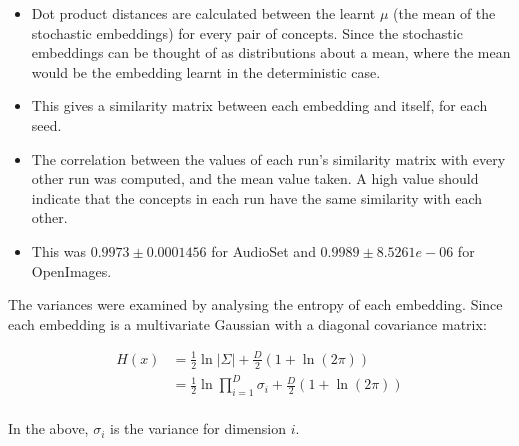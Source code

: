 \begin{itemize}
    \item Dot product distances are calculated between the learnt $\mu$ (the mean of the stochastic embeddings) for every pair of concepts. Since the stochastic embeddings can be thought of as distributions about a mean, where the mean would be the embedding learnt in the deterministic case. 
    \item This gives a similarity matrix between each embedding and itself, for each seed. 
    \item The correlation between the values of each run's similarity matrix with every other run was computed, and the mean value taken. A high value should indicate that the concepts in each run have the same similarity with each other. 
    \item This was $0.9973 \pm 0.0001456$ for AudioSet and $0.9989 \pm 8.5261e-06$ for OpenImages. 
\end{itemize}

The variances were examined by analysing the entropy of each embedding. Since each embedding is a multivariate Gaussian with a diagonal covariance matrix:

\begin{equation}
\begin{split}
H(x) &= \frac{1}{2} \ln |\Sigma| + \frac{D}{2}(1 + \ln(2 \pi))\\
&= \frac{1}{2} \ln \prod_{i=1}^D \sigma_i + \frac{D}{2}(1 + \ln(2 \pi))\\
\end{split}
\end{equation}

In the above, $\sigma_i$ is the variance for dimension $i$. 
 
